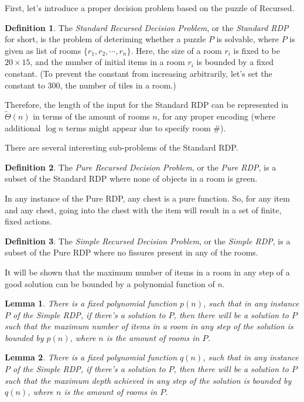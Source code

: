 \documentclass[a4paper]{article}
\theoremstyle{theorem}
\newtheorem{lemma}{Lemma}[section]
\theoremstyle{definition}
\newtheorem{definition}{Definition}[section]
\begin{document}
First, let's introduce a proper decision problem based on the puzzle of Recursed.
\begin{definition}
The \emph{Standard Recursed Decision Problem}, or the \emph{Standard RDP} for short, is the problem of deteriming
whether a puzzle $P$ is solvable, where $P$ is given as list of rooms $\{r_1, r_2, \cdots, r_n\}$.
Here, the size of a room $r_i$ is fixed to be $20 \times 15$, and the number of initial items in a room $r_i$ is bounded by
a fixed constant. (To prevent the constant from increasing arbitrarily, let's set the constant to $300$, the number of tiles in a room.)
\end{definition}
Therefore, the length of the input for the Standard RDP can be represented in $\tilde{\Theta}(n)$ in terms of the amount
of rooms $n$, for any proper encoding (where additional $\log n$ terms might appear due to specify room \#).

There are several interesting sub-problems of the Standard RDP.
\begin{definition}
The \emph{Pure Recursed Decision Problem}, or the \emph{Pure RDP}, is a subset of the Standard RDP where none of objects in a room is green.
\end{definition}
In any instance of the Pure RDP, any chest is a pure function. So, for any item and any chest, going into the chest with the item will result in a set of finite, fixed actions.

\begin{definition}
The \emph{Simple Recursed Decision Problem}, or the \emph{Simple RDP}, is a subset of the Pure RDP where no fissures present in any of the rooms.
\end{definition}

It will be shown that the maximum number of items in a room in any step of a good solution can be bounded by a polynomial function of $n$.
\begin{lemma}
There is a fixed polynomial function $p(n)$, such that in any instance $P$ of the Simple RDP, if there's a solution to $P$,
then there will be a solution to $P$ such that the maximum number of items in a room in any step of the solution is bounded by $p(n)$,
where $n$ is the amount of rooms in $P$.
\end{lemma}

\begin{lemma}
There is a fixed polynomial function $q(n)$, such that in any instance $P$ of the Simple RDP, if there's a solution to $P$,
then there will be a solution to $P$ such that the maximum depth achieved in any step of the solution is bounded by $q(n)$,
where $n$ is the amount of rooms in $P$.
\end{lemma}
\end{document}
